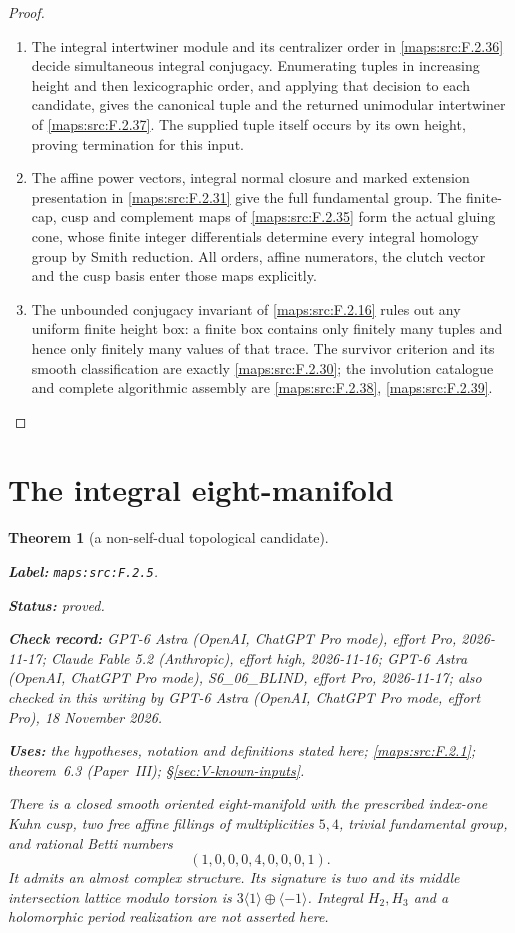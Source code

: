 \documentclass[11pt,a4paper]{article}
\newtheorem{theorem}{Theorem}[section]
\theoremstyle{definition}
\newcommand{\StatementRecord}[4]{\par\smallskip\begingroup\upshape\raggedright\noindent\textbf{Label:} \nolinkurl{#1}.\par\noindent\textbf{Status:} #2.\par\noindent\textbf{Check record:} #3.\par\noindent\textbf{Uses:} #4.\par\endgroup\smallskip}
\newcommand{\CurrentChecker}{GPT-6 Astra (OpenAI, ChatGPT Pro mode, effort Pro), 18 November 2026}
\newcommand{\ExternalPaperRef}[3]{\ifmmode\text{\upshape #1#2 (Paper~#3)}\else #1#2 (Paper~#3)\fi}
\begin{document}
\begin{proof}
\begin{enumerate}[label=\arabic*.]
\item The integral intertwiner module and its centralizer order in
\cref{maps:src:F.2.36} decide simultaneous integral conjugacy. Enumerating
tuples in increasing height and then lexicographic order, and applying
that decision to each candidate, gives the canonical tuple and the
returned unimodular intertwiner of \cref{maps:src:F.2.37}. The supplied
tuple itself occurs by its own height, proving termination for this input.
\item The affine power vectors, integral normal closure and marked
extension presentation in \cref{maps:src:F.2.31} give the full fundamental
group. The finite-cap, cusp and complement maps of
\cref{maps:src:F.2.35} form the actual gluing cone, whose finite integer
differentials determine every integral homology group by Smith reduction.
All orders, affine numerators, the clutch vector and the cusp basis enter
those maps explicitly.
\item The unbounded conjugacy invariant of \cref{maps:src:F.2.16}
rules out any uniform finite height box: a finite box contains only
finitely many tuples and hence only finitely many values of that trace.
The survivor criterion and its smooth classification are exactly
\cref{maps:src:F.2.30}; the involution catalogue and complete algorithmic
assembly are \cref{maps:src:F.2.38}, \cref{maps:src:F.2.39}.
\end{enumerate}
\end{proof}



\section{The integral eight-manifold}



\begin{theorem}[a non-self-dual topological candidate]\label{maps:src:F.2.5}
\StatementRecord{maps:src:F.2.5}{proved}{GPT-6 Astra (OpenAI, ChatGPT Pro mode), effort Pro, 2026-11-17; Claude Fable 5.2 (Anthropic), effort high, 2026-11-16; GPT-6 Astra (OpenAI, ChatGPT Pro mode), S6\_06\_BLIND, effort Pro, 2026-11-17; also checked in this writing by \CurrentChecker}{the hypotheses, notation and definitions stated here; \cref{maps:src:F.2.1}; \ExternalPaperRef{theorem~}{6.3}{III}; \S\ref{sec:V-known-inputs}}


There is a closed smooth oriented eight-manifold with the prescribed
index-one Kuhn cusp, two free affine fillings of multiplicities $5,4$,
trivial fundamental group, and rational Betti numbers
\[
 (1,0,0,0,4,0,0,0,1). \tag{F.5}\label{maps:eq:F.5}
\]
It admits an almost complex structure.  Its signature is two and
its middle intersection lattice modulo torsion is
$3\langle1\rangle\oplus\langle-1\rangle$.
Integral $H_2,H_3$ and a holomorphic period realization are not
asserted here.

\end{theorem}
\end{document}
